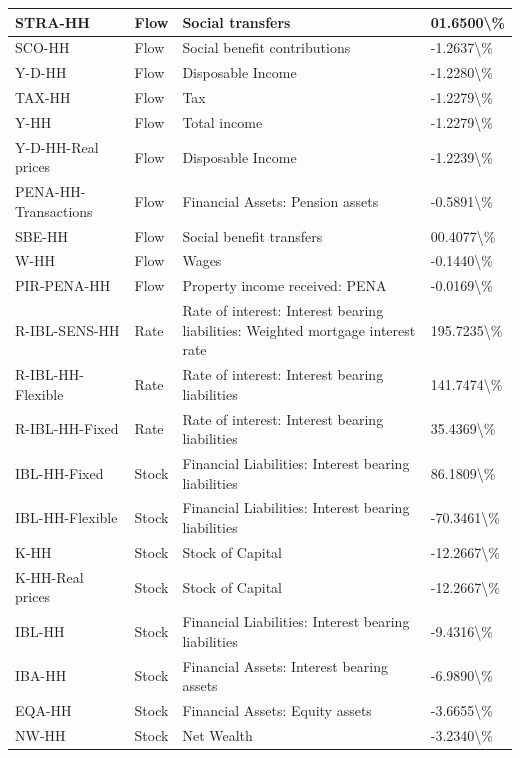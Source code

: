 \documentclass[
]{book}
\begin{document}
\begin{table}
\begin{tabular}[t]{l|l|l|l}
\hline
STRA-HH & Flow & Social transfers & 01.6500\textbackslash{}\%\\
\hline
SCO-HH & Flow & Social benefit contributions & -1.2637\textbackslash{}\%\\
\hline
Y-D-HH & Flow & Disposable Income & -1.2280\textbackslash{}\%\\
\hline
TAX-HH & Flow & Tax & -1.2279\textbackslash{}\%\\
\hline
Y-HH & Flow & Total income & -1.2279\textbackslash{}\%\\
\hline
Y-D-HH-Real prices & Flow & Disposable Income & -1.2239\textbackslash{}\%\\
\hline
PENA-HH-Transactions & Flow & Financial Assets: Pension assets & -0.5891\textbackslash{}\%\\
\hline
SBE-HH & Flow & Social benefit transfers & 00.4077\textbackslash{}\%\\
\hline
W-HH & Flow & Wages & -0.1440\textbackslash{}\%\\
\hline
PIR-PENA-HH & Flow & Property income received: PENA & -0.0169\textbackslash{}\%\\
\hline
R-IBL-SENS-HH & Rate & Rate of interest: Interest bearing liabilities: Weighted mortgage interest rate & 195.7235\textbackslash{}\%\\
\hline
R-IBL-HH-Flexible & Rate & Rate of interest: Interest bearing liabilities & 141.7474\textbackslash{}\%\\
\hline
R-IBL-HH-Fixed & Rate & Rate of interest: Interest bearing liabilities & 35.4369\textbackslash{}\%\\
\hline
IBL-HH-Fixed & Stock & Financial Liabilities: Interest bearing liabilities & 86.1809\textbackslash{}\%\\
\hline
IBL-HH-Flexible & Stock & Financial Liabilities: Interest bearing liabilities & -70.3461\textbackslash{}\%\\
\hline
K-HH & Stock & Stock of Capital & -12.2667\textbackslash{}\%\\
\hline
K-HH-Real prices & Stock & Stock of Capital & -12.2667\textbackslash{}\%\\
\hline
IBL-HH & Stock & Financial Liabilities: Interest bearing liabilities & -9.4316\textbackslash{}\%\\
\hline
IBA-HH & Stock & Financial Assets: Interest bearing assets & -6.9890\textbackslash{}\%\\
\hline
EQA-HH & Stock & Financial Assets: Equity assets & -3.6655\textbackslash{}\%\\
\hline
NW-HH & Stock & Net Wealth & -3.2340\textbackslash{}\%\\

\end{tabular}
\end{table}
\end{document}
